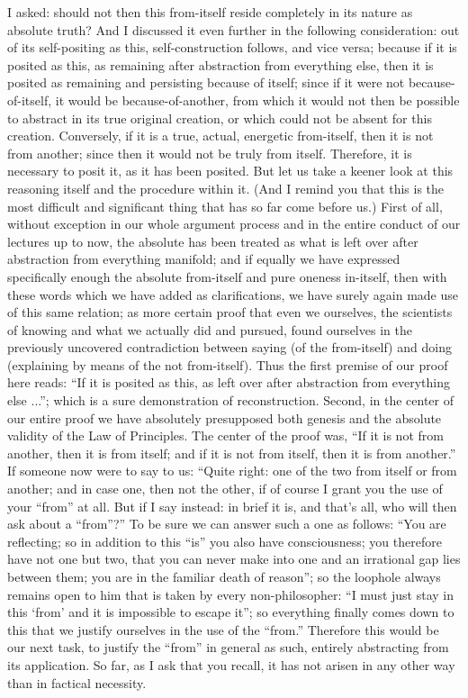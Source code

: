 I asked: should not then this from-itself reside completely
in its nature as absolute truth?
And I discussed it even further in the following consideration:
out of its self-positing as this,
self-construction follows, and vice versa;
because if it is posited as this,
as remaining after abstraction from everything else,
then it is posited as remaining and persisting because of itself;
since if it were not because-of-itself,
it would be because-of-another,
from which it would not then be possible to abstract
in its true original creation,
or which could not be absent for this creation.
Conversely, if it is a true, actual, energetic from-itself,
then it is not from another;
since then it would not be truly from itself.
Therefore, it is necessary to posit it, as it has been posited.
But let us take a keener look at this reasoning itself
and the procedure within it.
(And I remind you that this is the most difficult
and significant thing that has so far come before us.)
First of all, without exception in our whole argument process
and in the entire conduct of our lectures up to now,
the absolute has been treated as what is left over
after abstraction from everything manifold;
and if equally we have expressed specifically enough
the absolute from-itself and pure oneness in-itself,
then with these words which we have added as clarifications,
we have surely again made use of this same relation;
as more certain proof that even we ourselves,
the scientists of knowing and what we actually did and pursued,
found ourselves in the previously uncovered contradiction
between saying (of the from-itself)
and doing (explaining by means of the not from-itself).
Thus the first premise of our proof here reads:
“If it is posited as this,
as left over after abstraction
from everything else ...”;
which is a sure demonstration of reconstruction.
Second, in the center of our entire proof
we have absolutely presupposed both genesis
and the absolute validity of the Law of Principles.
The center of the proof was,
“If it is not from another, then it is from itself;
and if it is not from itself, then it is from another.”
If someone now were to say to us:
“Quite right: one of the two
from itself or from another;
and in case one, then not the other,
if of course I grant you the use of your “from” at all.
But if I say instead:
in brief it is, and that's all,
who will then ask about a “from”?”
To be sure we can answer such a one as follows:
“You are reflecting; so in addition to this “is”
you also have consciousness;
you therefore have not one but two,
that you can never make into one
and an irrational gap lies between them;
you are in the familiar death of reason”;
so the loophole always remains open to him
that is taken by every non-philosopher:
“I must just stay in this ‘from'
and it is impossible to escape it”;
so everything finally comes down to this
that we justify ourselves in the use of the “from.”
Therefore this would be our next task,
to justify the “from” in general as such,
entirely abstracting from its application.
So far, as I ask that you recall,
it has not arisen in any other way
than in factical necessity.

